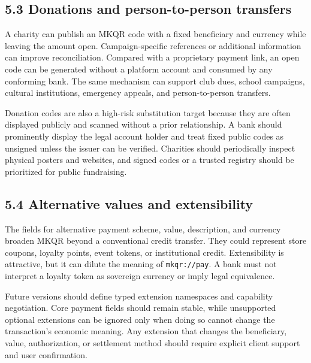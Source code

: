 \subsection{5.3 Donations and person-to-person transfers}

A charity can publish an MKQR code with a fixed beneficiary and currency while leaving the amount open. Campaign-specific references or additional information can improve reconciliation. Compared with a proprietary payment link, an open code can be generated without a platform account and consumed by any conforming bank. The same mechanism can support club dues, school campaigns, cultural institutions, emergency appeals, and person-to-person transfers.

Donation codes are also a high-risk substitution target because they are often displayed publicly and scanned without a prior relationship. A bank should prominently display the legal account holder and treat fixed public codes as unsigned unless the issuer can be verified. Charities should periodically inspect physical posters and websites, and signed codes or a trusted registry should be prioritized for public fundraising.

\subsection{5.4 Alternative values and extensibility}

The fields for alternative payment scheme, value, description, and currency broaden MKQR beyond a conventional credit transfer. They could represent store coupons, loyalty points, event tokens, or institutional credit. Extensibility is attractive, but it can dilute the meaning of \texttt{mkqr://pay}. A bank must not interpret a loyalty token as sovereign currency or imply legal equivalence.

Future versions should define typed extension namespaces and capability negotiation. Core payment fields should remain stable, while unsupported optional extensions can be ignored only when doing so cannot change the transaction's economic meaning. Any extension that changes the beneficiary, value, authorization, or settlement method should require explicit client support and user confirmation.

